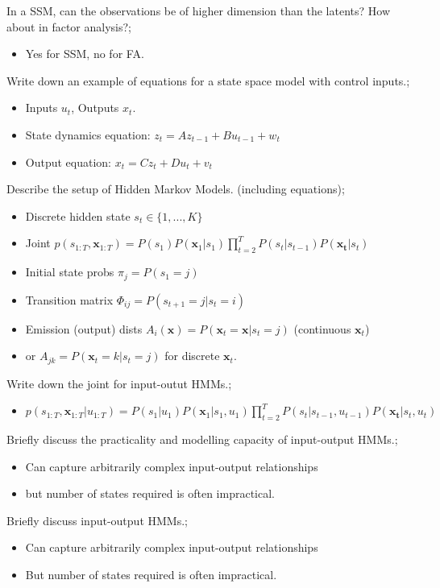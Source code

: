 \documentclass{article}
\begin{document}
In a SSM, can the observations be of higher dimension than the latents? How about in factor analysis?; \begin{itemize} \item Yes for SSM, no for FA.  \end{itemize}

Write down an example of equations for a state space model with control inputs.; \begin{itemize} \item Inputs $u_t$, Outputs $x_t$.  \item State dynamics equation: $z_t=Az_{t-1}+Bu_{t-1}+w_t$ \item Output equation: $x_t=Cz_t+Du_t+v_t$ \end{itemize}

Describe the setup of Hidden Markov Models. (including equations); \begin{itemize} \item Discrete hidden state $s_t\in \{1,...,K\}$ \item Joint $p(s_{1:T}, \mathbf{x}_{1:T})=P(s_1)P(\mathbf{x}_1|s_1)\prod_{t=2}^TP(s_t|s_{t-1})P(\mathbf{x_t}|s_t)$ \item Initial state probs $\pi_j = P(s_1=j)$ \item Transition matrix $\Phi_{ij}=P(s_{t+1}=j|s_t=i)$ \item Emission (output) dists $A_i(\mathbf{x})=P(\mathbf{x}_t=\mathbf{x}|s_t=j)$ (continuous $\mathbf{x}_t$) \item or $A_{jk}=P(\mathbf{x}_t=k|s_t=j)$ for discrete $\mathbf{x}_t$.  \end{itemize}

Write down the joint for input-outut HMMs.; \begin{itemize} \item $p(s_{1:T}, \mathbf{x}_{1:T}|u_{1:T})=P(s_1|u_1)P(\mathbf{x}_1|s_1, u_1)\prod_{t=2}^TP(s_t|s_{t-1}, u_{t-1})P(\mathbf{x_t}|s_t, u_t)$ \end{itemize}

Briefly discuss the practicality and modelling capacity of input-output HMMs.; \begin{itemize} \item Can capture arbitrarily complex input-output relationships \item but number of states required is often impractical.  \end{itemize} 

Briefly discuss input-output HMMs.; \begin{itemize} \item Can capture arbitrarily complex input-output relationships \item But number of states required is often impractical.  \end{itemize}
\end{document}

